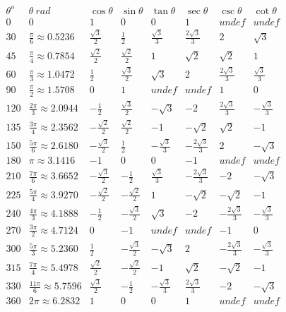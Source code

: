 \documentclass[a4paper,11pt]{article}
\begin{document}
\(\begin{matrix}
{\theta^{o}} & {\theta\ {rad}} & {\cos\theta} & {\sin\theta} & {\tan\theta} & {\sec\theta} & {\csc\theta} & {\cot\theta} \\
0 & 0 & 1 & 0 & 0 & 1 & {undef} & {undef} \\
30 & {\frac{\pi}{6} \approx 0.5236} & \frac{\sqrt{3}}{2} & \frac{1}{2} & \frac{\sqrt{3}}{3} & \frac{2\sqrt{3}}{3} & 2 & \sqrt{3} \\
45 & {\frac{\pi}{4} \approx 0.7854} & \frac{\sqrt{2}}{2} & \frac{\sqrt{2}}{2} & 1 & \sqrt{2} & \sqrt{2} & 1 \\
60 & {\frac{\pi}{3} \approx 1.0472} & \frac{1}{2} & \frac{\sqrt{3}}{2} & \sqrt{3} & 2 & \frac{2\sqrt{3}}{3} & \frac{\sqrt{3}}{3} \\
90 & {\frac{\pi}{2} \approx 1.5708} & 0 & 1 & {undef} & {undef} & 1 & 0 \\
120 & {\frac{2\pi}{3} \approx 2.0944} & {- \frac{1}{2}} & \frac{\sqrt{3}}{2} & {- \sqrt{3}} & {- 2} & \frac{2\sqrt{3}}{3} & {- \frac{\sqrt{3}}{3}} \\
135 & {\frac{3\pi}{4} \approx 2.3562} & {- \frac{\sqrt{2}}{2}} & \frac{\sqrt{2}}{2} & {- 1} & {- \sqrt{2}} & \sqrt{2} & {- 1} \\
150 & {\frac{5\pi}{6} \approx 2.6180} & {- \frac{\sqrt{3}}{2}} & \frac{1}{2} & {- \frac{\sqrt{3}}{3}} & {- \frac{2\sqrt{3}}{3}} & 2 & {- \sqrt{3}} \\
180 & {\pi \approx 3.1416} & {- 1} & 0 & 0 & {- 1} & {undef} & {undef} \\
210 & {\frac{7\pi}{6} \approx 3.6652} & {- \frac{\sqrt{3}}{2}} & {- \frac{1}{2}} & \frac{\sqrt{3}}{3} & {- \frac{2\sqrt{3}}{3}} & {- 2} & {- \sqrt{3}} \\
225 & {\frac{5\pi}{4} \approx 3.9270} & {- \frac{\sqrt{2}}{2}} & {- \frac{\sqrt{2}}{2}} & 1 & {- \sqrt{2}} & {- \sqrt{2}} & {- 1} \\
240 & {\frac{4\pi}{3} \approx 4.1888} & {- \frac{1}{2}} & {- \frac{\sqrt{3}}{2}} & \sqrt{3} & {- 2} & {- \frac{2\sqrt{3}}{3}} & {- \frac{\sqrt{3}}{3}} \\
270 & {\frac{3\pi}{2} \approx 4.7124} & 0 & {- 1} & {undef} & {undef} & {- 1} & 0 \\
300 & {\frac{5\pi}{3} \approx 5.2360} & \frac{1}{2} & {- \frac{\sqrt{3}}{2}} & {- \sqrt{3}} & 2 & {- \frac{2\sqrt{3}}{3}} & {- \frac{\sqrt{3}}{3}} \\
315 & {\frac{7\pi}{4} \approx 5.4978} & \frac{\sqrt{2}}{2} & {- \frac{\sqrt{2}}{2}} & {- 1} & \sqrt{2} & {- \sqrt{2}} & {- 1} \\
330 & {\frac{11\pi}{6} \approx 5.7596} & \frac{\sqrt{3}}{2} & {- \frac{1}{2}} & {- \frac{\sqrt{3}}{3}} & \frac{2\sqrt{3}}{3} & {- 2} & {- \sqrt{3}} \\
360 & {2\pi \approx 6.2832} & 1 & 0 & 0 & 1 & {undef} & {undef} \\
\end{matrix}\)
\end{document}
